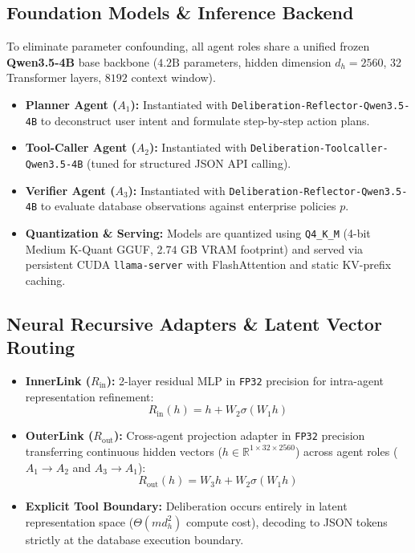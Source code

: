 \documentclass[11pt,a4paper]{article}
\begin{document}
\subsection{Foundation Models \& Inference Backend}
To eliminate parameter confounding, all agent roles share a unified frozen \textbf{Qwen3.5-4B} base backbone ($4.2\text{B}$ parameters, hidden dimension $d_h=2560$, 32 Transformer layers, $8192$ context window).
\begin{itemize}
    \item \textbf{Planner Agent ($A_1$):} Instantiated with \texttt{Deliberation-Reflector-Qwen3.5-4B} to deconstruct user intent and formulate step-by-step action plans.
    \item \textbf{Tool-Caller Agent ($A_2$):} Instantiated with \texttt{Deliberation-Toolcaller-Qwen3.5-4B} (tuned for structured JSON API calling).
    \item \textbf{Verifier Agent ($A_3$):} Instantiated with \texttt{Deliberation-Reflector-Qwen3.5-4B} to evaluate database observations against enterprise policies $p$.
    \item \textbf{Quantization \& Serving:} Models are quantized using \texttt{Q4\_K\_M} (4-bit Medium K-Quant GGUF, $2.74\text{ GB}$ VRAM footprint) and served via persistent CUDA \texttt{llama-server} with FlashAttention and static KV-prefix caching.
\end{itemize}

\subsection{Neural Recursive Adapters \& Latent Vector Routing}
\begin{itemize}
    \item \textbf{InnerLink ($R_{\text{in}}$):} 2-layer residual MLP in \texttt{FP32} precision for intra-agent representation refinement:
    \begin{equation}
        R_{\text{in}}(h) = h + W_2 \sigma(W_1 h)
    \end{equation}
    \item \textbf{OuterLink ($R_{\text{out}}$):} Cross-agent projection adapter in \texttt{FP32} precision transferring continuous hidden vectors ($h \in \mathbb{R}^{1 \times 32 \times 2560}$) across agent roles ($A_1 \to A_2$ and $A_3 \to A_1$):
    \begin{equation}
        R_{\text{out}}(h) = W_3 h + W_2 \sigma(W_1 h)
    \end{equation}
    \item \textbf{Explicit Tool Boundary:} Deliberation occurs entirely in latent representation space ($\Theta(m d_h^2)$ compute cost), decoding to JSON tokens strictly at the database execution boundary.
\end{itemize}
\end{document}
